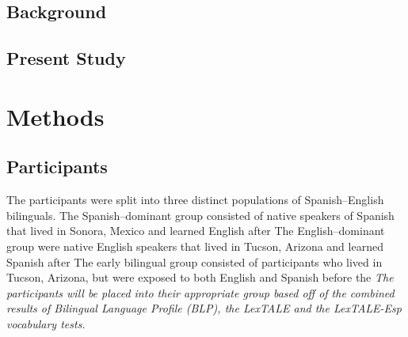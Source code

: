 \subsection{Background}



\subsection{Present Study}



\section{Methods}


\subsection{Participants}

The participants were split into three distinct populations of Spanish–English bilinguals. The Spanish–dominant group consisted of native speakers of Spanish that lived in Sonora, Mexico and learned English after %
The English–dominant group were native English speakers that lived in Tucson, Arizona and learned Spanish after%
The early bilingual group consisted of participants who lived in Tucson, Arizona, but were exposed to both English and Spanish before the %
\emph{The participants will be placed into their appropriate group based off of the combined results of Bilingual Language Profile (BLP), the LexTALE and the LexTALE-Esp vocabulary tests.} 

